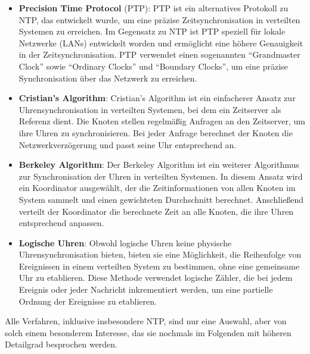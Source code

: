 \documentclass[../vs-script-first-v01.tex]{subfiles}
\begin{document}
\begin{itemize}
\item \textbf{Precision Time Protocol} (PTP): PTP ist ein alternatives Protokoll zu NTP, das entwickelt wurde, um eine präzise Zeitsynchronisation in verteilten Systemen zu erreichen. Im Gegensatz zu NTP ist PTP speziell für lokale Netzwerke (LANs) entwickelt worden und ermöglicht eine höhere Genauigkeit in der Zeitsynchronisation. PTP verwendet einen sogenannten \enquote{Grandmaster Clock} sowie \enquote{Ordinary Clocks} und \enquote{Boundary Clocks}, um eine präzise Synchronisation über das Netzwerk zu erreichen.
\item \textbf{Cristian's Algorithm}: Cristian's Algorithm ist ein einfacherer Ansatz zur Uhrensynchronisation in verteilten Systemen, bei dem ein Zeitserver als Referenz dient. Die Knoten stellen regelmäßig Anfragen an den Zeitserver, um ihre Uhren zu synchronisieren. Bei jeder Anfrage berechnet der Knoten die Netzwerkverzögerung und passt seine Uhr entsprechend an.
\item \textbf{Berkeley Algorithm}: Der Berkeley Algorithm ist ein weiterer Algorithmus zur Synchronisation der Uhren in verteilten Systemen. In diesem Ansatz wird ein Koordinator ausgewählt, der die Zeitinformationen von allen Knoten im System sammelt und einen gewichteten Durchschnitt berechnet. Anschließend verteilt der Koordinator die berechnete Zeit an alle Knoten, die ihre Uhren entsprechend anpassen.
\item \textbf{Logische Uhren}: Obwohl logische Uhren keine physische Uhrensynchronisation bieten, bieten sie eine Möglichkeit, die Reihenfolge von Ereignissen in einem verteilten System zu bestimmen, ohne eine gemeinsame Uhr zu etablieren. Diese Methode verwendet logische Zähler, die bei jedem Ereignis oder jeder Nachricht inkrementiert werden, um eine partielle Ordnung der Ereignisse zu etablieren.
\end{itemize}
Alle Verfahren, inklusive insbesondere NTP, sind nur eine Auswahl, aber von solch einem besonderem Interesse, das sie nochmals im Folgenden mit höheren Detailgrad besprochen werden.
\end{document}
